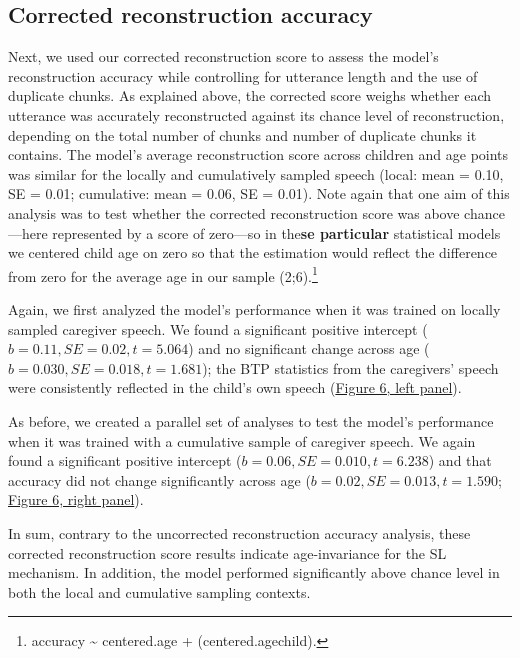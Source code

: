 \documentclass[
  english,
  man,mask,floatsintext]{apa6}
\begin{document}
\hypertarget{corrected-reconstruction-accuracy-1}{%
\subsection{Corrected reconstruction accuracy}\label{corrected-reconstruction-accuracy-1}}

Next, we used our corrected reconstruction score to assess the model's reconstruction accuracy while controlling for utterance length and the use of duplicate chunks. As explained above, the corrected score weighs whether each utterance was accurately reconstructed against its chance level of reconstruction, depending on the total number of chunks and number of duplicate chunks it contains. The model's average reconstruction score across children and age points was similar for the locally and cumulatively sampled speech (local: mean = 0.10, SE = 0.01; cumulative: mean = 0.06, SE = 0.01). Note again that one aim of this analysis was to test whether the corrected reconstruction score was above chance---here represented by a score of zero---so in the\textbf{se particular} statistical models we centered child age on zero so that the estimation would reflect the difference from zero for the average age in our sample (2;6).\footnote{accuracy \textasciitilde{} centered.age + (centered.age\textbar child).}

Again, we first analyzed the model's performance when it was trained on locally sampled caregiver speech. We found a significant positive intercept (\(b = 0.11, SE = 0.02, t = 5.064\)) and no significant change across age (\(b = 0.030, SE = 0.018, t = 1.681\)); the BTP statistics from the caregivers' speech were consistently reflected in the child's own speech (\protect\hyperlink{fig6}{Figure 6, left panel}).

As before, we created a parallel set of analyses to test the model's performance when it was trained with a cumulative sample of caregiver speech. We again found a significant positive intercept (\(b= 0.06, SE = 0.010, t = 6.238\)) and that accuracy did not change significantly across age (\(b=0.02, SE = 0.013, t = 1.590\); \protect\hyperlink{fig6}{Figure 6, right panel}).

In sum, contrary to the uncorrected reconstruction accuracy analysis, these corrected reconstruction score results indicate age-invariance for the SL mechanism. In addition, the model performed significantly above chance level in both the local and cumulative sampling contexts.
\end{document}

